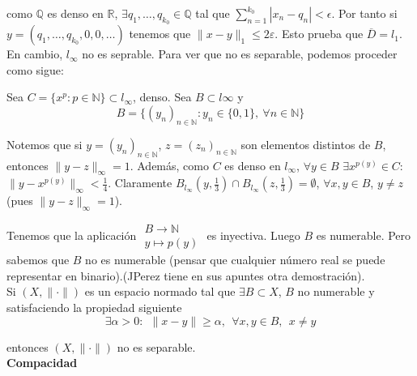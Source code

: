 \documentclass{article}
\begin{document}
como $\mathbb{Q}$ es denso en $\mathbb{R}$, $\exists q_1,\ldots,q_{k_0}\in\mathbb{Q}$ tal que $\sum_{n=1}^{k_0}|x_n-q_n|<\epsilon$. Por tanto si $y=(q_1,\ldots,q_{k_0},0,0,\ldots)$ tenemos que $\|x-y\|_1\leq 2\varepsilon$. Esto prueba que $\overline{D}=l_1$.\\

En cambio, $l_\infty$ no es seprable. Para ver que no es separable, podemos proceder como sigue:

Sea $C=\{x^p:p\in\mathbb{N}\}\subset l_\infty$, denso. Sea $B\subset l\infty$ y 
\begin{equation*}
B=\{(y_n)_{n\in\mathbb{N}}:y_n\in\{0,1\},\:\forall n\in \mathbb{N}\}
\end{equation*}

Notemos que si $y=(y_n)_{n\in \mathbb{N}}$, $z=(z_n)_{n\in\mathbb{N}}$ son elementos distintos de $B$, entonces $\|y-z\|_{\infty}=1$. Además, como $C$ es denso en $l_\infty$, $\forall y\in B$ $\exists x^{p(y)}\in C$:$\|y-x^{p(y)}\|_{\infty}<\frac{1}{4}$. Claramente $B_{l_\infty}(y,\frac{1}{3})\cap B_{l_\infty}(z,\frac{1}{3})=\emptyset$, $\forall x,y\in B$, $y\neq z$ (pues $\|y-z\|_\infty=1$).

Tenemos que la aplicación $\left.\begin{array}{c}
B\rightarrow \mathbb{N}\\
y\mapsto p(y)
\end{array}\right.$ es inyectiva. Luego $B$ es numerable. Pero sabemos que $B$ no es numerable (pensar que cualquier número real se puede representar en binario).(JPerez tiene en sus apuntes otra demostración).\\

Si $(X,\|\cdot\|)$ es un espacio normado tal que $\exists B\subset X$, $B$ no numerable y satisfaciendo la propiedad siguiente
\begin{equation*}
\exists\alpha>0:\:\: \|x-y\|\geq \alpha,\:\:\forall x,y\in B,\:\:x\neq y
\end{equation*}

entonces $(X,\|\cdot\|)$ no es separable.\\

\textbf{Compacidad}\\
\end{document}
